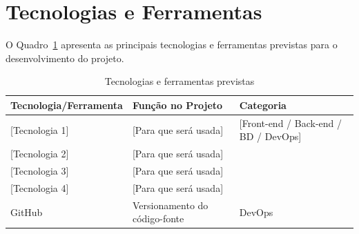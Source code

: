 
\section{Tecnologias e Ferramentas}


O Quadro~\ref{qua:tecnologias} apresenta as principais tecnologias e ferramentas previstas para o desenvolvimento do projeto.

\begin{table}[htb]
\caption{Tecnologias e ferramentas previstas}
\label{qua:tecnologias}
\begin{tabularx}{\textwidth}{lXl}
  \toprule
  \textbf{Tecnologia/Ferramenta} & \textbf{Função no Projeto} & \textbf{Categoria} \\
  \midrule
  {[Tecnologia 1]} & {[Para que será usada]} & {[Front-end / Back-end / BD / DevOps]} \\
  {[Tecnologia 2]} & {[Para que será usada]} & \\
  {[Tecnologia 3]} & {[Para que será usada]} & \\
  {[Tecnologia 4]} & {[Para que será usada]} & \\
  GitHub         & Versionamento do código-fonte & DevOps \\
  \bottomrule
\end{tabularx}
\end{table}




%
